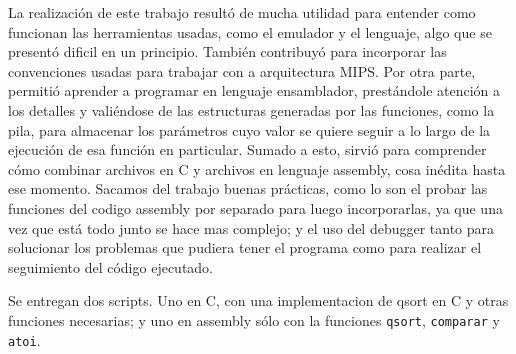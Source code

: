 \documentclass[a4paper, 12pt]{article}
\begin{document}
	La realización de este trabajo resultó de mucha utilidad para entender como funcionan las herramientas usadas, como el emulador y el lenguaje, algo que se presentó dificil en un principio. También contribuyó para incorporar las convenciones usadas para trabajar con a arquitectura MIPS.
	Por otra parte, permitió aprender a programar en lenguaje ensamblador, prestándole atención a los detalles y valiéndose de las estructuras generadas por las funciones, como la pila, para almacenar los parámetros cuyo valor se quiere seguir a lo largo de la ejecución de esa función en particular. Sumado a esto, sirvió para comprender cómo combinar archivos en C y archivos en lenguaje assembly, cosa inédita hasta ese momento.
	Sacamos del trabajo buenas prácticas, como lo son el probar las funciones del codigo assembly por separado para luego incorporarlas, ya que una vez que está todo junto se hace mas complejo; y el uso del debugger tanto para solucionar los problemas que pudiera tener el programa como para realizar el seguimiento del código ejecutado.
	
	Se entregan dos scripts. Uno en C, con una implementacion de qsort en C y otras funciones necesarias; y uno en assembly sólo con la funciones \texttt{qsort}, \texttt{comparar} y \texttt{atoi}.
\end{document}
